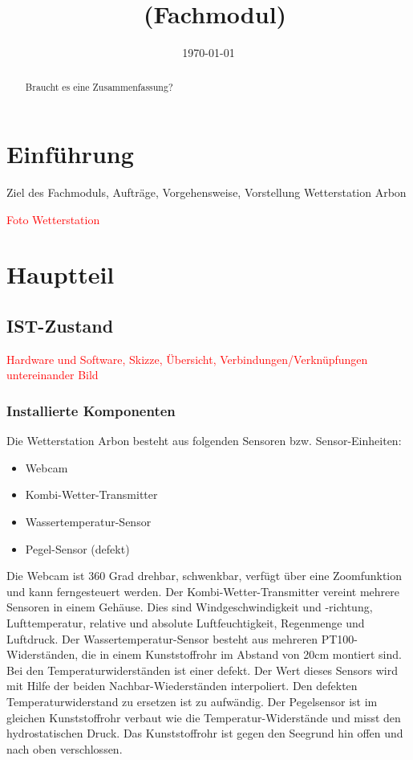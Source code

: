 \documentclass[a4paper,ngerman, 12pt]{report}
\title{\projektName~(Fachmodul)}
\author{\authorName}
\date{\today}
\newcommand\Diskussionspunkt[1]{\textcolor{red}{#1}}
\begin{document}

\setcounter{page}{2}
\tableofcontents          
\clearpage
{}


\begin{abstract}
Braucht es eine Zusammenfassung?
\end{abstract}


\chapter{Einführung}
Ziel des Fachmoduls, Aufträge, Vorgehensweise, Vorstellung Wetterstation Arbon

\Diskussionspunkt{Foto Wetterstation}


\chapter{Hauptteil}

\section{IST-Zustand}
\Diskussionspunkt{Hardware und Software, 
Skizze, 
Übersicht, 
Verbindungen/Verknüpfungen untereinander}
\Diskussionspunkt{Bild}

\subsection{Installierte Komponenten}

Die Wetterstation Arbon besteht aus folgenden Sensoren bzw. Sensor-Einheiten:
\begin{itemize}  
\item Webcam
\item Kombi-Wetter-Transmitter
\item Wassertemperatur-Sensor
\item Pegel-Sensor (defekt)
\end{itemize}


Die Webcam ist 360 Grad drehbar, schwenkbar, verfügt über eine Zoomfunktion und kann ferngesteuert werden.  Der Kombi-Wetter-Transmitter vereint mehrere Sensoren in einem Gehäuse. Dies sind Windgeschwindigkeit und -richtung, Lufttemperatur, relative und absolute Luftfeuchtigkeit, Regenmenge und Luftdruck. Der Wassertemperatur-Sensor besteht aus mehreren PT100-Widerständen, die in einem Kunststoffrohr im Abstand von 20cm montiert sind. Bei den Temperaturwiderständen ist einer defekt. Der Wert dieses Sensors wird mit Hilfe der beiden Nachbar-Wiederständen interpoliert. Den defekten Temperaturwiderstand zu ersetzen ist zu aufwändig. Der Pegelsensor ist im gleichen Kunststoffrohr verbaut wie die Temperatur-Widerstände und misst den hydrostatischen Druck. Das Kunststoffrohr ist gegen den Seegrund hin offen und nach oben verschlossen.
\end{document}
